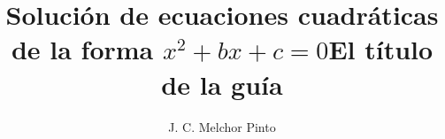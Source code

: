 \documentclass[12pt,addpoints,answers]{guia}
\title{Solución de ecuaciones cuadráticas de la forma $x^2+bx+c=0$}
\title{El título de la guía}
\author{J. C. Melchor Pinto}
\begin{document}
\pagestyle{headandfoot}

\INFO
% 
\begin{questions}
    
\end{questions}

\end{document}
